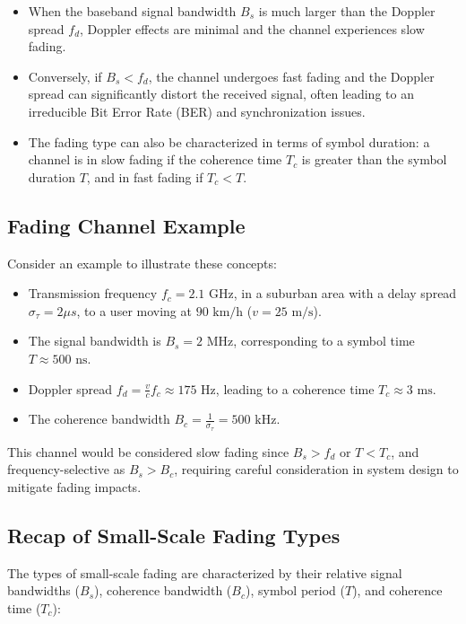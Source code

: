 \begin{itemize}
    \item When the baseband signal bandwidth \(B_s\) is much larger than the Doppler spread \(f_d\), Doppler effects are minimal and the channel experiences slow fading.
    \item Conversely, if \(B_s < f_d\), the channel undergoes fast fading and the Doppler spread can significantly distort the received signal, often leading to an irreducible Bit Error Rate (BER) and synchronization issues.
    \item The fading type can also be characterized in terms of symbol duration: a channel is in slow fading if the coherence time \(T_c\) is greater than the symbol duration \(T\), and in fast fading if \(T_c < T\).
\end{itemize}

\subsection*{Fading Channel Example}

Consider an example to illustrate these concepts:

\begin{itemize}
    \item Transmission frequency \(f_c = 2.1 \text{ GHz}\), in a suburban area with a delay spread \( \sigma_{\tau} = 2 \mu s \), to a user moving at \(90 \text{ km/h}\) (\(v = 25 \text{ m/s}\)).
    \item The signal bandwidth is \(B_s = 2 \text{ MHz}\), corresponding to a symbol time \(T \approx 500 \text{ ns}\).
    \item Doppler spread \(f_d = \frac{v}{c}f_c \approx 175 \text{ Hz}\), leading to a coherence time \(T_c \approx 3 \text{ ms}\).
    \item The coherence bandwidth \(B_c = \frac{1}{\sigma_{\tau}} = 500 \text{ kHz}\).
\end{itemize}

This channel would be considered slow fading since \(B_s > f_d\) or \(T < T_c\), and frequency-selective as \(B_s > B_c\), requiring careful consideration in system design to mitigate fading impacts.


\subsection*{Recap of Small-Scale Fading Types}

The types of small-scale fading are characterized by their relative signal bandwidths (\(B_s\)), coherence bandwidth (\(B_c\)), symbol period (\(T\)), and coherence time (\(T_c\)):

